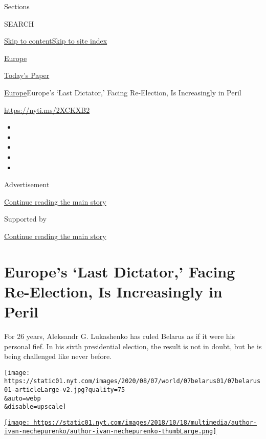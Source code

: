 Sections

SEARCH

\protect\hyperlink{site-content}{Skip to
content}\protect\hyperlink{site-index}{Skip to site index}

\href{https://www.nytimes.com/section/world/europe}{Europe}

\href{https://myaccount.nytimes.com/auth/login?response_type=cookie\&client_id=vi}{}

\href{https://www.nytimes.com/section/todayspaper}{Today's Paper}

\href{/section/world/europe}{Europe}\textbar{}Europe's `Last Dictator,'
Facing Re-Election, Is Increasingly in Peril

\href{https://nyti.ms/2XCKXB2}{https://nyti.ms/2XCKXB2}

\begin{itemize}
\item
\item
\item
\item
\item
\end{itemize}

Advertisement

\protect\hyperlink{after-top}{Continue reading the main story}

Supported by

\protect\hyperlink{after-sponsor}{Continue reading the main story}

\hypertarget{europes-last-dictator-facing-re-election-is-increasingly-in-peril}{%
\section{Europe's `Last Dictator,' Facing Re-Election, Is Increasingly
in
Peril}\label{europes-last-dictator-facing-re-election-is-increasingly-in-peril}}

For 26 years, Aleksandr G. Lukashenko has ruled Belarus as if it were
his personal fief. In his sixth presidential election, the result is not
in doubt, but he is being challenged like never before.

\texttt{[image: https://static01.nyt.com/images/2020/08/07/world/07belarus01/07belarus01-articleLarge-v2.jpg?quality=75\\\&auto=webp\\\&disable=upscale]}

\href{https://www.nytimes.com/by/ivan-nechepurenko}{\texttt{[image: https://static01.nyt.com/images/2018/10/18/multimedia/author-ivan-nechepurenko/author-ivan-nechepurenko-thumbLarge.png]}}

